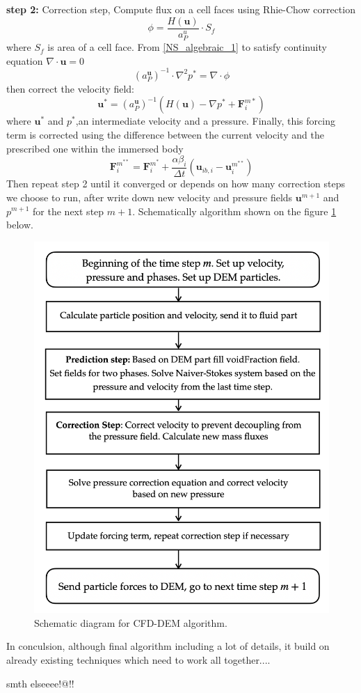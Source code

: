 \textbf{step 2:} Correction step,
Compute flux on a cell faces using Rhie-Chow \cite{rhie} correction
\begin{equation}
    \phi = \frac{H(\mathbf{u})}{a^u_P}\cdot S_f
\end{equation}
where $S_f$ is area of a cell face.
From \ref{NS_algebraic_1} to satisfy continuity equation $\nabla\cdot \mathbf{u} = 0$
\begin{equation}
    (a_{P}^{\mathbf{u}})^{-1} \cdot \nabla^2 p^* = \nabla \cdot \phi
\end{equation}
then correct the velocity field:
\begin{equation}
    \mathbf{u}^{*} = (a_{P}^{\mathbf{u}})^{-1}(H(\mathbf{u}) - \nabla p^* + \mathbf{F}^{m*}_i)
\end{equation}
where $\mathbf{u}^*$ and $p^*$,an intermediate velocity and a pressure. Finally, this forcing term is corrected using the difference between the current velocity and the prescribed one within the immersed body
\begin{equation}
\mathbf{F}_{i}^{m^{* *}} = \boldsymbol{F}_{i}^{m^{*}}+\frac{\alpha \beta_{i}}{\Delta t}\left(\boldsymbol{u}_{i b, i}-\boldsymbol{u}_{i}^{m^{* *}}\right)
\end{equation}
Then repeat step 2 until it converged or depends on how many correction steps we choose to run, after write down new velocity and pressure fields $\mathbf{u}^{m+1}$ and $p^{m+1}$ for the next step $m + 1$. Schematically algorithm shown on the figure \ref{fig:diag_PISO} below.

\begin{figure}[h]
    \centering
    \includegraphics[width=12cm]{Images/chap3/diag_PISO.png}
    \caption{Schematic diagram for CFD-DEM algorithm.}
    \label{fig:diag_PISO}
\end{figure}

In conculsion, although final algorithm including a lot of details, it build on already existing techniques which need to work all together....

smth elseeee!@!!